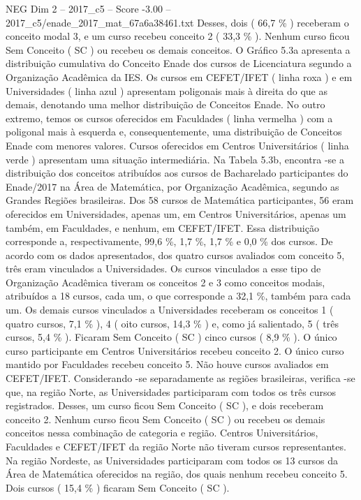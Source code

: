 \begin{textsample}{NEG Dim 2 – 2017\_c5 – Score -3.00 – 2017\_c5/enade\_2017\_mat\_67a6a38461.txt}
Desses, dois ( 66,7 \% ) receberam o conceito modal 3, e um curso recebeu conceito 2 ( 33,3 \% ).
Nenhum curso ficou Sem Conceito ( SC ) ou recebeu os demais conceitos.
O Gráfico 5.3a apresenta a distribuição cumulativa do Conceito Enade dos cursos de Licenciatura segundo a Organização Acadêmica da IES.
Os cursos em CEFET/IFET ( linha roxa ) e em Universidades ( linha azul ) apresentam poligonais mais à direita do que as demais, denotando uma melhor distribuição de Conceitos Enade.
No outro extremo, temos os cursos oferecidos em Faculdades ( linha vermelha ) com a poligonal mais à esquerda e, consequentemente, uma distribuição de Conceitos Enade com menores valores.
Cursos oferecidos em Centros Universitários ( linha verde ) apresentam uma situação intermediária.
Na Tabela 5.3b, encontra -se a distribuição dos conceitos atribuídos aos cursos de Bacharelado participantes do Enade/2017 na Área de Matemática, por Organização Acadêmica, segundo as Grandes Regiões brasileiras.
Dos 58 cursos de Matemática participantes, 56 eram oferecidos em Universidades, apenas um, em Centros Universitários, apenas um também, em Faculdades, e nenhum, em CEFET/IFET.
Essa distribuição corresponde a, respectivamente, 99,6 \%, 1,7 \%, 1,7 \% e 0,0 \% dos cursos.
De acordo com os dados apresentados, dos quatro cursos avaliados com conceito 5, três eram vinculados a Universidades.
Os cursos vinculados a esse tipo de Organização Acadêmica tiveram os conceitos 2 e 3 como conceitos modais, atribuídos a 18 cursos, cada um, o que corresponde a 32,1 \%, também para cada um.
Os demais cursos vinculados a Universidades receberam os conceitos 1 ( quatro cursos, 7,1 \% ), 4 ( oito cursos, 14,3 \% ) e, como já salientado, 5 ( três cursos, 5,4 \% ).
Ficaram Sem Conceito ( SC ) cinco cursos ( 8,9 \% ).
O único curso participante em Centros Universitários recebeu conceito 2.
O único curso mantido por Faculdades recebeu conceito 5.
Não houve cursos avaliados em CEFET/IFET.
Considerando -se separadamente as regiões brasileiras, verifica -se que, na região Norte, as Universidades participaram com todos os três cursos registrados.
Desses, um curso ficou Sem Conceito ( SC ), e dois receberam conceito 2.
Nenhum curso ficou Sem Conceito ( SC ) ou recebeu os demais conceitos nessa combinação de categoria e região.
Centros Universitários, Faculdades e CEFET/IFET da região Norte não tiveram cursos representantes.
Na região Nordeste, as Universidades participaram com todos os 13 cursos da Área de Matemática oferecidos na região, dos quais nenhum recebeu conceito 5.
Dois cursos ( 15,4 \% ) ficaram Sem Conceito ( SC ).

\end{textsample}
